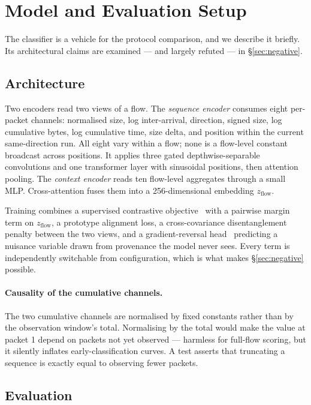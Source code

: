 \section{Model and Evaluation Setup}
\label{sec:model}

The classifier is a vehicle for the protocol comparison, and we describe it
briefly. Its architectural claims are examined --- and largely refuted --- in
\S\ref{sec:negative}.

\subsection{Architecture}

Two encoders read two views of a flow. The \emph{sequence encoder} consumes
eight per-packet channels: normalised size, log inter-arrival, direction,
signed size, log cumulative bytes, log cumulative time, size delta, and
position within the current same-direction run. All eight vary within a flow;
none is a flow-level constant broadcast across positions. It applies three
gated depthwise-separable convolutions and one transformer layer with
sinusoidal positions, then attention pooling. The \emph{context encoder} reads
ten flow-level aggregates through a small MLP. Cross-attention fuses them into
a 256-dimensional embedding $z_{\mathrm{flow}}$.

Training combines a supervised contrastive objective~\cite{khosla2020supcon}
with a pairwise margin term on $z_{\mathrm{flow}}$, a prototype alignment loss,
a cross-covariance disentanglement penalty between the two views, and a
gradient-reversal head~\cite{ganin2015grl} predicting a nuisance variable drawn
from provenance the model never sees. Every term is independently switchable
from configuration, which is what makes \S\ref{sec:negative} possible.

\paragraph{Causality of the cumulative channels.} The two cumulative channels
are normalised by fixed constants rather than by the observation window's
total. Normalising by the total would make the value at packet 1 depend on
packets not yet observed --- harmless for full-flow scoring, but it silently
inflates early-classification curves. A test asserts that truncating a sequence
is exactly equal to observing fewer packets.

\subsection{Evaluation}

